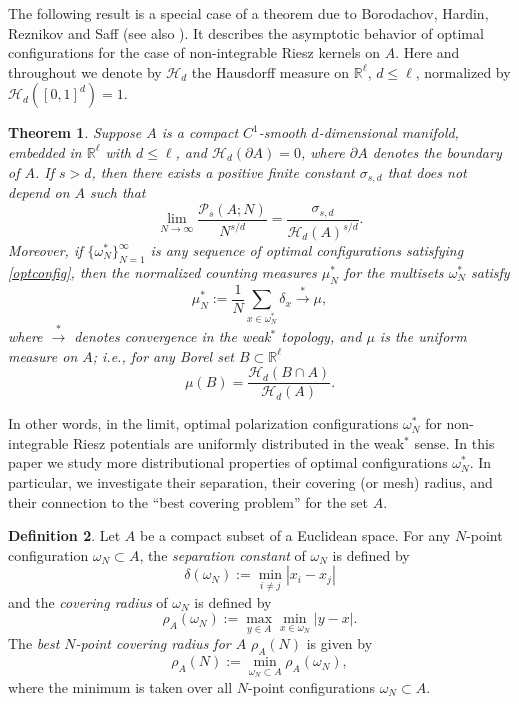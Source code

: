 \documentclass[12pt]{amsart}
\newtheorem{theorem}{Theorem}[section]
\theoremstyle{definition}
\newtheorem{defin}[theorem]{Definition}
\def\sli{\sum\limits}
\def\R{\mathbb{R}}
\newcommand{\1}{\mathbf{1}}
\newcommand{\PP}{\mathcal{P}}
\def\H{\mathcal{H}}
\begin{document}
The following result is a special case of a theorem due to Borodachov, Hardin, Reznikov and Saff \cite{borodachov2016optimal} (see also \cite{Borodachov2016}). It describes the asymptotic behavior of optimal configurations for the case of non-integrable Riesz kernels on $A$. Here and throughout we denote by $\H_d$ the Hausdorff measure on $\R^\ell$, $d\leqslant \ell$, normalized by $\H_d([0,1]^d)=1$.
\begin{theorem}\label{thborodachovetal}
Suppose $A$ is a compact $C^1$-smooth $d$-dimensional manifold, embedded in $\R^\ell$ with $d\leqslant \ell$, and $\H_d(\partial A)=0$, where $\partial A$ denotes the boundary of $A$. If $s>d$, then there exists a positive finite constant $\sigma_{s,d}$ that does not depend on $A$ such that
\begin{equation}\label{definofsigma}
\lim_{N\to \infty} \frac{\PP_s(A; N)}{N^{s/d}} = \frac{\sigma_{s, d}}{\H_d(A)^{s/d}}.
\end{equation}
Moreover, if $\{\omega_N^*\}_{N=1}^\infty$ is any sequence of optimal configurations satisfying \eqref{optconfig}, then the normalized counting measures $\mu_N^*$ for the multisets $\omega_N^*$ satisfy
$$
\mu^*_N:=\frac{1}{N}\sli_{x\in \omega^*_N} \delta_{x} \stackrel{*}{\to} \mu,
$$
where $\stackrel{*}{\to}$ denotes convergence in the weak$^*$ topology, and $\mu$ is the uniform measure on $A$; i.e., for any Borel set $B\subset \R^\ell$
$$
\mu(B)=\frac{\H_d(B\cap A)}{\H_d(A)}.
$$
\end{theorem}
In other words, in the limit, optimal polarization configurations $\omega_N^*$ for non-integrable Riesz potentials are uniformly distributed in the weak$^*$ sense. In this paper we study more distributional properties of optimal configurations $\omega_N^*$. In particular, we investigate their separation, their covering (or mesh) radius, and their connection to the ``best covering problem'' for the set $A$. 
\begin{defin}
Let $A$ be a compact subset of a Euclidean space. For any $N$-point configuration $\omega_N\subset A$, the {\it separation constant} of $\omega_N$ is defined by
$$
\delta(\omega_N):=\min_{i\not=j}|x_i-x_j|
$$
and the {\it covering radius} of $\omega_N$ is defined by
\begin{equation}
\rho_A(\omega_N):=\max_{y\in A}\min_{x\in \omega_N} |y-x|.
\end{equation}
The {\it best $N$-point covering radius for $A$} $\rho_A(N)$ is given by
\begin{equation}\label{defbestcovering}
\rho_A(N):=\min_{\omega_N\subset A} \rho_A(\omega_N),
\end{equation}
where the minimum is taken over all $N$-point configurations $\omega_N\subset A$. 
\end{defin}
\end{document}
